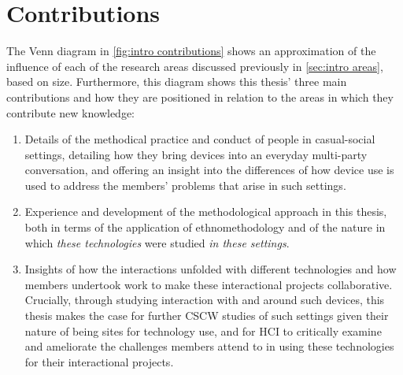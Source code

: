 \section{Contributions}\label{sec:intro contributions}
\begin{revisedsubmission}
The Venn diagram in \autoref{fig:intro contributions} shows an approximation of the influence of each of the research areas discussed previously in \ref{sec:intro areas}, based on size.
Furthermore, this diagram shows this thesis' three main contributions and how they are positioned in relation to the areas in which they contribute new knowledge:



\begin{enumerate}[label=\Alph*]
    \item Details of the methodical practice and conduct of people in casual-social settings, detailing how they bring devices into an everyday multi-party conversation, and offering an insight into the differences of how device use is used to address the members' problems that arise in such settings.

    \item Experience and development of the methodological approach in this thesis, both in terms of the application of ethnomethodology and of the nature in which \textit{these technologies} were studied \textit{in these settings}.

    \item Insights of how the interactions unfolded with different technologies and how members undertook work to make these interactional projects collaborative.
    Crucially, through studying interaction with and around such devices, this thesis makes the case for further \ac{CSCW} studies of such settings given their nature of being sites for technology use, and for \ac{HCI} to critically examine and ameliorate the challenges members attend to in using these technologies for their interactional projects.
\end{enumerate}
\end{revisedsubmission}

